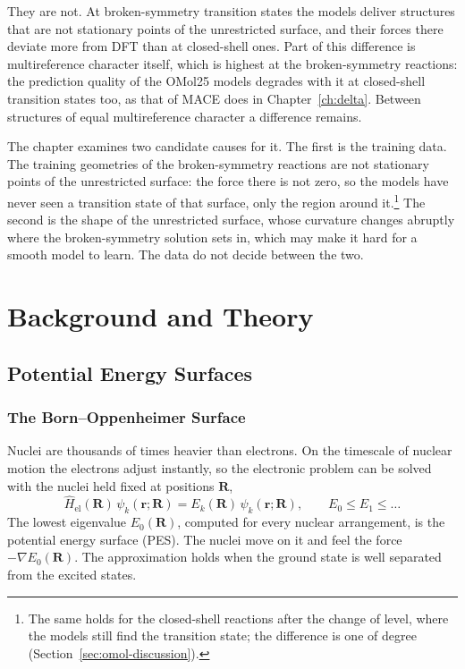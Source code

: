 They are not. At broken-symmetry transition states the models deliver
structures that are not stationary points of the unrestricted surface,
and their forces there deviate more from DFT than at closed-shell ones.
Part of this difference is multireference character itself, which is
highest at the broken-symmetry reactions: the prediction quality of the
OMol25 models degrades with it at closed-shell transition states too,
as that of MACE does in Chapter~\ref{ch:delta}. Between structures of
equal multireference character a difference remains.

The chapter examines two candidate causes for it. The first is the
training data.
The training geometries of the broken-symmetry reactions are not
stationary points of the unrestricted surface: the force there is
not zero, so the models have never seen a transition state of that
surface, only the region around it.\footnote{The same holds for the
closed-shell reactions after the change of level, where the models
still find the transition state; the difference is one of degree
(Section~\ref{sec:omol-discussion}).}
The second is the shape of the unrestricted surface, whose curvature
changes abruptly where the broken-symmetry solution sets in, which may
make it hard for a smooth model to learn. The data do not decide
between the two.

\newpage
\chapter{Background and Theory}

\section{Potential Energy Surfaces}
\label{sec:background-pes}

\subsection{The Born--Oppenheimer Surface}
\label{sec:background-bo}

Nuclei are thousands of times heavier than electrons. On the timescale of
nuclear motion the electrons adjust instantly, so the electronic problem can
be solved with the nuclei held fixed at positions $\mathbf{R}$,
\begin{equation}
  \hat{H}_\text{el}(\mathbf{R})\, \psi_k(\mathbf{r};\mathbf{R})
  = E_k(\mathbf{R})\, \psi_k(\mathbf{r};\mathbf{R}),
  \qquad E_0 \le E_1 \le \dots
  \label{eq:electronic-schrodinger}
\end{equation}
The lowest eigenvalue $E_0(\mathbf{R})$, computed for every nuclear
arrangement, is the potential energy surface (PES). The nuclei move on it and
feel the force $-\nabla E_0(\mathbf{R})$. The approximation holds when the
ground state is well separated from the excited states.

